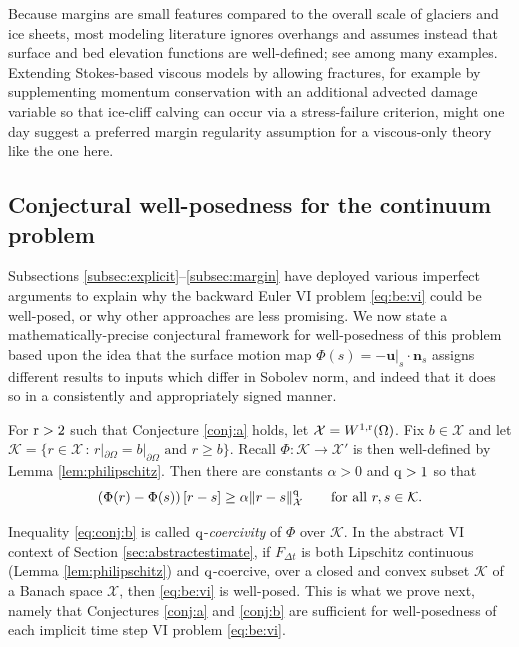 \documentclass[hidelinks,onefignum,onetabnum,final]{siamart220329}  %
\newcommand{\bn}{\mathbf{n}}
\newcommand{\bu}{\mathbf{u}}
\newcommand{\cK}{\mathcal{K}}
\newcommand{\cX}{\mathcal{X}}
\newcommand{\qq}{{\text{\textnormal{q}}}}
\newcommand{\rr}{{\text{\textnormal{r}}}}
\begin{document}
Because margins are small features compared to the overall scale of glaciers and ice sheets, most modeling literature ignores overhangs and assumes instead that surface and bed elevation functions are well-defined; see \cite{IsaacStadlerGhattas2015,Jouvetetal2008,LofgrenAhlkronaHelanow2022,WirbelJarosch2020} among many examples.  Extending Stokes-based viscous models by allowing fractures, for example by supplementing momentum conservation with an additional advected damage variable \cite{PralongFunk2005} so that ice-cliff calving can occur via a stress-failure criterion, might one day suggest a preferred margin regularity assumption for a viscous-only theory like the one here.

\subsection{Conjectural well-posedness for the continuum problem} \label{subsec:conjecture} Subsections \ref{subsec:explicit}--\ref{subsec:margin} have deployed various imperfect arguments to explain why the backward Euler VI problem \eqref{eq:be:vi} could be well-posed, or why other approaches are less promising.  We now state a mathematically-precise conjectural framework for well-posedness of this problem based upon the idea that the surface motion map $\Phi(s) = -\bu|_s\cdot \bn_s$ assigns different results to inputs which differ in Sobolev norm, and indeed that it does so in a consistently and appropriately signed manner.

\begin{conjecture} \label{conj:b}  For $\rr>2$ such that Conjecture \ref{conj:a} holds, let $\cX = W^{1,\rr}(\Omega)$.  Fix $b\in\cX$ and let $\cK=\{r\in\cX\,:\,r|_{\partial\Omega}=b|_{\partial\Omega} \text{ and } r\ge b\}$.  Recall $\Phi:\cK\to\cX'$ is then well-defined by Lemma \ref{lem:philipschitz}.  Then there are constants $\alpha>0$ and $\qq>1$ so that
\begin{equation}
\left(\Phi(r) - \Phi(s)\right)[r-s] \ge \alpha \|r-s\|_{\cX}^\qq \qquad \text{for all } r,s\in\cK. \label{eq:conj:b}
\end{equation}
\end{conjecture}

Inequality \eqref{eq:conj:b} is called $\qq$-\emph{coercivity} of $\Phi$ over $\cK$.  In the abstract VI context of Section \ref{sec:abstractestimate}, if $F_{\Delta t}$ is both Lipschitz continuous (Lemma \ref{lem:philipschitz}) and $\qq$-coercive, over a closed and convex subset $\cK$ of a Banach space $\cX$, then \eqref{eq:be:vi} is well-posed.  This is what we prove next, namely that Conjectures \ref{conj:a} and \ref{conj:b} are sufficient for well-posedness of each implicit time step VI problem \eqref{eq:be:vi}.
\end{document}
